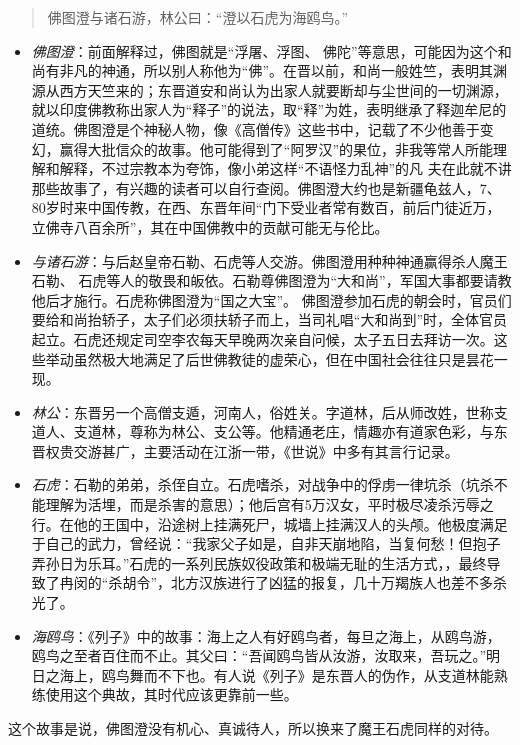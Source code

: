 \documentclass[]{book}
\providecommand{\tightlist}{%
  \setlength{\itemsep}{0pt}\setlength{\parskip}{0pt}}
\begin{document}
\begin{quote}
佛图澄与诸石游，林公曰：``澄以石虎为海鸥鸟。''
\end{quote}

\begin{itemize}
\tightlist
\item
  \emph{佛图澄}：前面解释过，佛图就是``浮屠、浮图、
  佛陀''等意思，可能因为这个和尚有非凡的神通，所以别人称他为``佛''。在晋以前，和尚一般姓竺，表明其渊源从西方天竺来的；东晋道安和尚认为出家人就要断却与尘世间的一切渊源，就以印度佛教称出家人为``释子''的说法，取``释''为姓，表明继承了释迦牟尼的道统。佛图澄是个神秘人物，像《高僧传》这些书中，记载了不少他善于变幻，赢得大批信众的故事。他可能得到了``阿罗汉''的果位，非我等常人所能理解和解释，不过宗教本为夸饰，像小弟这样``不语怪力乱神''的凡
  夫在此就不讲那些故事了，有兴趣的读者可以自行查阅。佛图澄大约也是新疆龟兹人，7、80岁时来中国传教，在西、东晋年间``门下受业者常有数百，前后门徒近万，立佛寺八百余所''，其在中国佛教中的贡献可能无与伦比。
\item
  \emph{与诸石游}：与后赵皇帝石勒、石虎等人交游。佛图澄用种种神通赢得杀人魔王石勒、
  石虎等人的敬畏和皈依。石勒尊佛图澄为``大和尚''，军国大事都要请教他后才施行。石虎称佛图澄为``国之大宝''。
  佛图澄参加石虎的朝会时，官员们要给和尚抬轿子，太子们必须扶轿子而上，当司礼唱``大和尚到''时，全体官员起立。石虎还规定司空李农每天早晚两次亲自问候，太子五日去拜访一次。这些举动虽然极大地满足了后世佛教徒的虚荣心，但在中国社会往往只是昙花一现。
\item
  \emph{林公}：东晋另一个高僧支遁，河南人，俗姓关。字道林，后从师改姓，世称支道人、支道林，尊称为林公、支公等。他精通老庄，情趣亦有道家色彩，与东晋权贵交游甚广，主要活动在江浙一带，《世说》中多有其言行记录。
\item
  \emph{石虎}：石勒的弟弟，杀侄自立。石虎嗜杀，对战争中的俘虏一律坑杀（坑杀不能理解为活埋，而是杀害的意思）；他后宫有5万汉女，平时极尽凌杀污辱之行。在他的王国中，沿途树上挂满死尸，城墙上挂满汉人的头颅。他极度满足于自己的武力，曾经说：``我家父子如是，自非天崩地陷，当复何愁！但抱子弄孙日为乐耳。''石虎的一系列民族奴役政策和极端无耻的生活方式，，最终导致了冉闵的``杀胡令''，北方汉族进行了凶猛的报复，几十万羯族人也差不多杀光了。
\item
  \emph{海鸥鸟}：《列子》中的故事：海上之人有好鸥鸟者，每旦之海上，从鸥鸟游，鸥鸟之至者百住而不止。其父曰：``吾闻鸥鸟皆从汝游，汝取来，吾玩之。''明日之海上，鸥鸟舞而不下也。有人说《列子》是东晋人的伪作，从支道林能熟练使用这个典故，其时代应该更靠前一些。
\end{itemize}

这个故事是说，佛图澄没有机心、真诚待人，所以换来了魔王石虎同样的对待。
\end{document}
